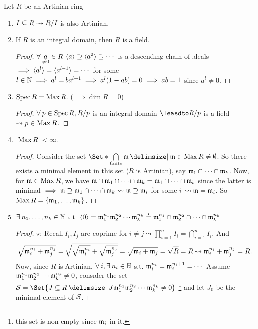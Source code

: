 \begin{prop}
  Let $R$ be an Artinian ring
  \begin{enumerate}[(1)]
    \item $I \subseteq R \leadsto {R}/{I}$ is also Artinian.
    \item If $R$ is an integral domain, then $R$ is a field.
      \begin{proof}
        $\forall \underset{\ne 0}{a} \in R, \gen{a} \supseteq \gen{a^2} \supseteq \dotsm$
        is a descending chain of ideals $\implies \langle a^l\rangle = \langle a^{l+1}\rangle = \dotsm$
        for some $l \in \mathbb{N} \implies a^l = ba^{l+1} \implies a^l(1 - ab) = 0
        \implies ab = 1$ since $a^l \ne 0$.
      \end{proof}
    \item $\operatorname{Spec} R = \operatorname{Max} R$. ($\implies \dim R = 0$)
      \begin{proof}
        $\forall p \in \Spec R, \quot{R}{p}$ is an integral domain
        $\leasdto \quot{R}{p}$ is a field $\leadsto p \in \operatorname{Max} R$.
      \end{proof}
    \item $\lvert\operatorname{Max} R\rvert < \infty$.
      \begin{proof}
        Consider the set $\Set*{ \bigcap\limits_{\text{finite}} \mf \given \mf \in \Max R}
        \ne \emptyset$. So there exists a minimal element in this set ($R$ is Artinian),
        say $\mathfrak{m}_1 \cap \dots \cap \mathfrak{m}_k$.  Now, for $\mathfrak{m} \in \operatorname{Max} R$, we have
        $\mathfrak{m}\cap \mathfrak{m}_1\cap \dots \cap\mathfrak{m}_k = \mathfrak{m}_1\cap \dots \cap\mathfrak{m}_k$ since the
        latter is minimal $\implies \mathfrak{m} \supseteq \mathfrak{m}_1\cap \dots\cap\mathfrak{m}_k
        \leadsto \mathfrak{m} \supseteq \mathfrak{m}_i$ for some $i$ $\leadsto \mathfrak{m} = \mathfrak{m}_i$.
        So $\operatorname{Max} R = \lbrace\mathfrak{m}_1, \dots, \mathfrak{m}_k\rbrace$.
      \end{proof}
    \item $\exists n_1, \dots, n_k \in \Nb$ s.t.
      $\langle0\rangle = \mathfrak{m}_1^{n_1}\mathfrak{m}_2^{n_2} \dotsm \mathfrak{m}_k^{n_k}
      \overset{\star}{=} \mathfrak{m}_1^{n_1}\cap \mathfrak{m}_2^{n_2} \cap \dots \cap \mathfrak{m}_k^{n_k}$.
      \begin{proof}
        $\star$: Recall $I_i, I_j$ are coprime for $i \ne j \leadsto
        \prod\limits_{i=1}^n I_i = \bigcap\limits_{i=1}^n I_i$.
        And
        \[
          \sqrt{\mathfrak{m}_i^{n_i} + \mathfrak{m}_j^{n_j}}
          = \sqrt{\sqrt{\mathfrak{m}_i^{n_i}} + \sqrt{\mathfrak{m}_j^{n_j}}}
          = \sqrt{\mathfrak{m}_i + \mathfrak{m}_j} = \sqrt{R} = R
          \leadsto \mathfrak{m}_i^{n_i} + \mathfrak{m}_j^{n_j} = R.
        \]
        Now, since $R$ is Artinian, $\forall i, \exists n_i \in \Nb$ s.t.
        $\mathfrak{m}_i^{n_i} = \mathfrak{m}_i^{n_i + 1} = \dotsm$
        Assume $\mathfrak{m}_1^{n_1}\mathfrak{m}_2^{n_2} \dotsm \mathfrak{m}_k^{n_k} \ne 0$, consider
        the set $\Sc = \Set{ J \subseteq R \given J \mf_1^{n_1}\mf_2^{n_2} \dotsm \mf_k^{n_k} \ne 0}$
        \footnote{this set is non-empty since $\mathfrak{m}_i$ in it.}
        and let $J_0$ be the minimal element of $\mathcal{S}$.


\end{proof}
\end{enumerate}
\end{prop}
